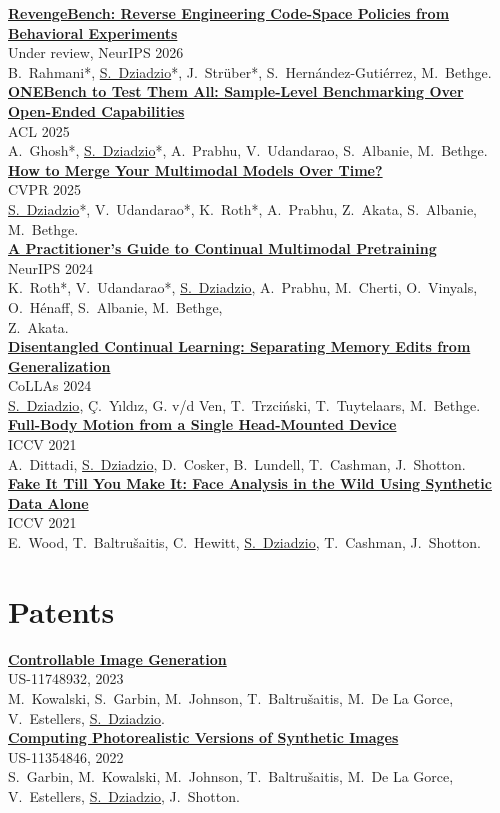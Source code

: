 \documentclass[]{friggeri-cv_osx}
\newcommand{\me}[1]{{\color{textcolor}\underline{#1}}}  %
\newcommand{\pubentry}[3]{%
  \textbf{#1}\\
  {\mediumfont #3}\\
  #2\vspace{\parsep}\\[\entryskip]
}
\begin{document}
{\setlength{\entryskip}{0.9em}
\begin{entrylistleft}
\pubentry{\href{https://arxiv.org/abs/2606.26094}{RevengeBench: Reverse Engineering Code-Space Policies from Behavioral Experiments}}{B.~Rahmani*, \me{S.~Dziadzio}*, J.~Strüber*, S.~Hernández-Gutiérrez, M.~Bethge.}{Under review, NeurIPS 2026}

\pubentry{\href{https://arxiv.org/abs/2412.06745}{ONEBench to Test Them All: Sample-Level Benchmarking Over Open-Ended Capabilities}}{A.~Ghosh*, \me{S.~Dziadzio}*, A.~Prabhu, V.~Udandarao, S.~Albanie, M.~Bethge.}{ACL 2025}

\pubentry{\href{https://arxiv.org/abs/2412.06712}{How to Merge Your Multimodal Models Over Time?}}{\me{S.~Dziadzio}*, V.~Udandarao*, K.~Roth*, A.~Prabhu, Z.~Akata, S.~Albanie, M.~Bethge.}{CVPR 2025}

\pubentry{\href{https://arxiv.org/abs/2408.14471}{A Practitioner's Guide to Continual Multimodal Pretraining}}{K.~Roth*, V.~Udandarao*, \me{S.~Dziadzio}, A.~Prabhu, M.~Cherti, O.~Vinyals, O.~Hénaff, S.~Albanie, M.~Bethge,\\ Z.~Akata.}{NeurIPS 2024}

\pubentry{\href{https://arxiv.org/abs/2312.16731}{Disentangled Continual Learning: Separating Memory Edits from Generalization}}{\me{S.~Dziadzio}, Ç.~Yıldız, G. v/d Ven, T.~Trzciński, T.~Tuytelaars, M.~Bethge.}{CoLLAs 2024}

\pubentry{\href{https://openaccess.thecvf.com/content/ICCV2021/papers/Dittadi_Full-Body_Motion_From_a_Single_Head-Mounted_Device_Generating_SMPL_Poses_ICCV_2021_paper.pdf}{Full-Body Motion from a Single Head-Mounted Device}}{A.~Dittadi, \me{S.~Dziadzio}, D.~Cosker, B.~Lundell, T.~Cashman, J.~Shotton.}{ICCV 2021}

\pubentry{\href{https://arxiv.org/abs/2109.15102}{Fake It Till You Make It: Face Analysis in the Wild Using Synthetic Data Alone}}{E.~Wood, T.~Baltru\v{s}aitis, C.~Hewitt, \me{S.~Dziadzio}, T.~Cashman, J.~Shotton.}{ICCV 2021}

\end{entrylistleft}}

\section{Patents}

{\setlength{\entryskip}{0.9em}
\begin{entrylistleft}
\pubentry{\href{https://patents.google.com/patent/US11748932B2/en}{Controllable Image Generation}}{M.~Kowalski, S.~Garbin, M.~Johnson, T.~Baltru\v{s}aitis, M.~De La Gorce, V.~Estellers, \me{S.~Dziadzio}.}{US-11748932, 2023}

\pubentry{\href{https://patents.google.com/patent/US11354846B2/en}{Computing Photorealistic Versions of Synthetic Images}}{S.~Garbin, M.~Kowalski, M.~Johnson, T.~Baltru\v{s}aitis, M.~De La Gorce, V.~Estellers, \me{S.~Dziadzio}, J.~Shotton.}{US-11354846, 2022}

\end{entrylistleft}}
\end{document}
